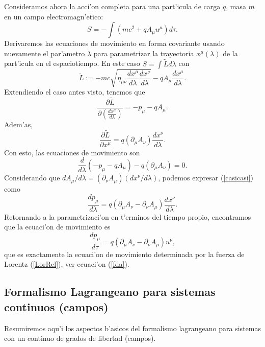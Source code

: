 Consideramos ahora la acci'on completa para una part'icula de carga $q$, masa
$m$ en un campo electromagn'etico:
\begin{equation}
\boxed{S=-\int \left(mc^2+ qA_\mu u^\mu \right) d\tau.}
\end{equation}
Derivaremos las ecuaciones de movimiento en forma covariante usando nuevamente
el par'ametro $\lambda$ para parametrizar la trayectoria $x^\mu(\lambda)$ de la
part'icula en el espaciotiempo. En este caso $S=\int \tilde{L}d\lambda$ con
\begin{equation}
\tilde{L}:=-mc\sqrt{\eta_{\mu\nu}\frac{dx^\mu}{d\lambda}\frac{dx^\nu}{d\lambda}}-qA_\mu \frac{dx^\mu}{d\lambda}. \label{Ltilde2}
\end{equation}
Extendiendo el caso antes visto, tenemos que
\begin{equation}
 \frac{\partial\tilde{L}}{\partial\left(\frac{dx^\mu}{d\lambda}\right)}=-p_\mu-qA_\mu.
\end{equation}
Adem'as,
\begin{equation}
\frac{\partial \tilde{L}}{\partial x^\mu}=q\left( \partial_\mu
A_\nu\right)  \frac{dx^\nu}{d\lambda}.
\end{equation}
Con esto, las ecuaciones de movimiento son
\begin{equation}
\frac{d}{d\lambda}\left( -p_\mu -qA_\mu\right) -q\left(
\partial_\mu A_\nu\right)=0. \label{casicasi}
\end{equation}
Considerando que ${dA_\mu}/{d\lambda}=\left( \partial_\nu A_\mu \right)
({dx^\nu}/{d\lambda})$, podemos expresar (\ref{casicasi}) como
\begin{equation}
\frac{dp_\mu}{d\lambda} =q\left( \partial_\mu A_\nu-\partial_\nu
A_\mu\right)\frac{dx^\nu}{d\lambda}.
\end{equation}
Retornando a la parametrizaci'on en t'erminos del tiempo propio, encontramos que
la ecuaci'on de movimiento es
\begin{equation}
\frac{dp_\mu}{d\tau} =q\left( \partial_\mu A_\nu-\partial_\nu
A_\mu\right)u^\nu,
\end{equation}
que es exactamente la ecuaci'on de movimiento determinada por la fuerza de
Lorentz (\ref{LorRel}), ver ecuaci'on (\ref{fda}).


\subsection{Formalismo Lagrangeano para sistemas continuos (campos)}
Resumiremos aqu'i los aspectos b'asicos del formalismo lagrangeano para sistemas
con un continuo de grados de libertad (campos).

